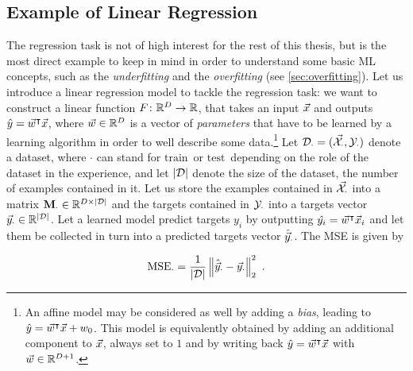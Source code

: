 
\subsection{Example of Linear Regression}
The regression task is not of high interest for the rest of this thesis, but is the most direct example to keep in mind in order to understand some basic ML concepts, such as the \emph{underfitting} and the \emph{overfitting} (see \ref{sec:overfitting}). Let us introduce a linear regression model to tackle the regression task: we want to construct a linear function $F\colon \mathbb{R}^D \rightarrow \mathbb{R}$, that takes an input $\vec{x}$ and outputs $\hat{y} = \vec{w}^\intercal \vec{x}$, where $\vec{w}\in \mathbb{R}^D$ is a vector of \emph{parameters} that have to be learned by a learning algorithm in order to well describe some data.\footnote{An affine model may be considered as well by adding a \emph{bias}, leading to $\hat{y} = \vec{w}^\intercal \vec{x}+w_0$. This model is equivalently obtained by adding an additional component to $\vec{x}$, always set to $1$ and by writing back $\hat{y} = \vec{w}^\intercal \vec{x}$ with $\vec{w}\in \mathbb{R}^{D+1}$. } 
Let $\mathcal{D}_{\cdot} = (\vec{\mathcal{X}}_{\cdot}, \mathcal{Y}_{\cdot})$ denote a dataset, where $\cdot$ can stand for \textquotedbl$\text{train}$\textquotedbl \ or \textquotedbl$\text{test}$\textquotedbl \ depending on the role of the dataset in the experience, and let $\lvert\mathcal{D}\rvert$ denote the size of the dataset, \ie the number of examples contained in it. Let us store the examples contained in $\vec{\mathcal{X}}_{\cdot}$ into a matrix $\textbf{M}_{\cdot}\in \mathbb{R}^{D \times \lvert\mathcal{D}\rvert}$ and the targets contained in $\mathcal{Y}_{\cdot}$ into a targets vector $\vec{y}_{\cdot}\in \mathbb{R}^{\lvert\mathcal{D}\rvert}$. Let a learned model predict targets $y_i$ by outputting $\hat{y_i} = \vec{w}^\intercal\vec{x}_i$ and let them be collected in turn into a predicted targets vector $\hat{\vec{y}}_{\cdot}$. The MSE is given by 

\begin{equation}
 \mathrm{MSE_{\cdot}} = \frac{1}{\lvert\mathcal{D}\rvert} \left\lVert\hat{\vec{y}}_{\cdot}-\vec{y}_{\cdot}\right\rVert^2_2 \mbox{ .}
\end{equation}

